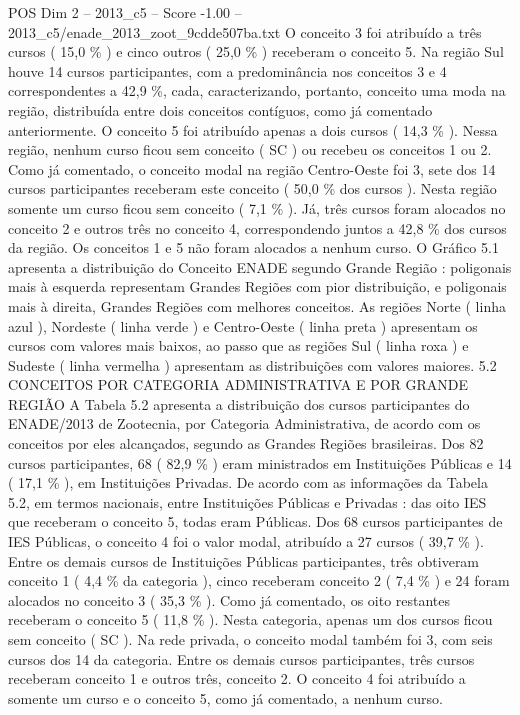 \begin{textsample}{POS Dim 2 – 2013\_c5 – Score -1.00 – 2013\_c5/enade\_2013\_zoot\_9cdde507ba.txt}
O conceito 3 foi atribuído a três cursos ( 15,0 \% ) e cinco outros ( 25,0 \% ) receberam o conceito 5.
Na região Sul houve 14 cursos participantes, com a predominância nos conceitos 3 e 4 correspondentes a 42,9 \%, cada, caracterizando, portanto, conceito uma moda na região, distribuída entre dois conceitos contíguos, como já comentado anteriormente.
O conceito 5 foi atribuído apenas a dois cursos ( 14,3 \% ).
Nessa região, nenhum curso ficou sem conceito ( SC ) ou recebeu os conceitos 1 ou 2.
Como já comentado, o conceito modal na região Centro-Oeste foi 3, sete dos 14 cursos participantes receberam este conceito ( 50,0 \% dos cursos ).
Nesta região somente um curso ficou sem conceito ( 7,1 \% ).
Já, três cursos foram alocados no conceito 2 e outros três no conceito 4, correspondendo juntos a 42,8 \% dos cursos da região.
Os conceitos 1 e 5 não foram alocados a nenhum curso.
O Gráfico 5.1 apresenta a distribuição do Conceito ENADE segundo Grande Região : poligonais mais à esquerda representam Grandes Regiões com pior distribuição, e poligonais mais à direita, Grandes Regiões com melhores conceitos.
As regiões Norte ( linha azul ), Nordeste ( linha verde ) e Centro-Oeste ( linha preta ) apresentam os cursos com valores mais baixos, ao passo que as regiões Sul ( linha roxa ) e Sudeste ( linha vermelha ) apresentam as distribuições com valores maiores. 5.2 CONCEITOS POR CATEGORIA ADMINISTRATIVA E POR GRANDE REGIÃO A Tabela 5.2 apresenta a distribuição dos cursos participantes do ENADE/2013 de Zootecnia, por Categoria Administrativa, de acordo com os conceitos por eles alcançados, segundo as Grandes Regiões brasileiras.
Dos 82 cursos participantes, 68 ( 82,9 \% ) eram ministrados em Instituições Públicas e 14 ( 17,1 \% ), em Instituições Privadas.
De acordo com as informações da Tabela 5.2, em termos nacionais, entre Instituições Públicas e Privadas : das oito IES que receberam o conceito 5, todas eram Públicas.
Dos 68 cursos participantes de IES Públicas, o conceito 4 foi o valor modal, atribuído a 27 cursos ( 39,7 \% ).
Entre os demais cursos de Instituições Públicas participantes, três obtiveram conceito 1 ( 4,4 \% da categoria ), cinco receberam conceito 2 ( 7,4 \% ) e 24 foram alocados no conceito 3 ( 35,3 \% ).
Como já comentado, os oito restantes receberam o conceito 5 ( 11,8 \% ).
Nesta categoria, apenas um dos cursos ficou sem conceito ( SC ).
Na rede privada, o conceito modal também foi 3, com seis cursos dos 14 da categoria.
Entre os demais cursos participantes, três cursos receberam conceito 1 e outros três, conceito 2.
O conceito 4 foi atribuído a somente um curso e o conceito 5, como já comentado, a nenhum curso.

\end{textsample}

